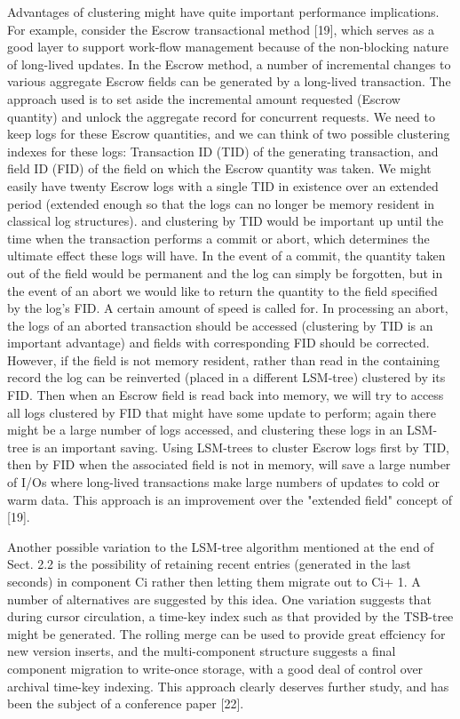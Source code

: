 \documentclass[a4paper,11pt,notitlepage,twoside,openright]{article}
\begin{document}
Advantages of clustering might have quite important performance
implications. For example, consider the Escrow transactional method
{[}19{]}, which serves as a good layer to support work-flow management
because of the non-blocking nature of long-lived updates. In the Escrow
method, a number of incremental changes to various aggregate Escrow
fields can be generated by a long-lived transaction. The approach used
is to set aside the incremental amount requested (Escrow quantity) and
unlock the aggregate record for concurrent requests. We need to keep
logs for these Escrow quantities, and we can think of two possible
clustering indexes for these logs: Transaction ID (TID) of the
generating transaction, and field ID (FID) of the field on which the
Escrow quantity was taken. We might easily have twenty Escrow logs with
a single TID in existence over an extended period (extended enough so
that the logs can no longer be memory resident in classical log
structures). and clustering by TID would be important up until the time
when the transaction performs a commit or abort, which determines the
ultimate effect these logs will have. In the event of a commit, the
quantity taken out of the field would be permanent and the log can
simply be forgotten, but in the event of an abort we would like to
return the quantity to the field specified by the log's FID. A certain
amount of speed is called for. In processing an abort, the logs of an
aborted transaction should be accessed (clustering by TID is an
important advantage) and fields with corresponding FID should be
corrected. However, if the field is not memory resident, rather than
read in the containing record the log can be reinverted (placed in a
different LSM-tree) clustered by its FID. Then when an Escrow field is
read back into memory, we will try to access all logs clustered by FID
that might have some update to perform; again there might be a large
number of logs accessed, and clustering these logs in an LSM-tree is an
important saving. Using LSM-trees to cluster Escrow logs first by TID,
then by FID when the associated field is not in memory, will save a
large number of I/Os where long-lived transactions make large numbers of
updates to cold or warm data. This approach is an improvement over the
"extended field" concept of {[}19{]}.

Another possible variation to the LSM-tree algorithm mentioned at the
end of Sect. 2.2 is the possibility of retaining recent entries
(generated in the last seconds) in component Ci rather then letting them
migrate out to Ci+ 1. A number of alternatives are suggested by this
idea. One variation suggests that during cursor circulation, a time-key
index such as that provided by the TSB-tree might be generated. The
rolling merge can be used to provide great effciency for new version
inserts, and the multi-component structure suggests a final component
migration to write-once storage, with a good deal of control over
archival time-key indexing. This approach clearly deserves further
study, and has been the subject of a conference paper {[}22{]}.
\end{document}
